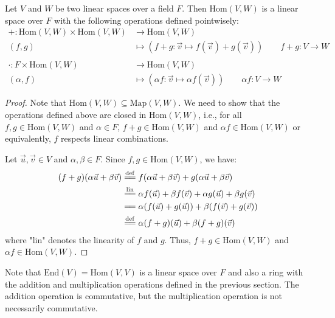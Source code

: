 \documentclass[11pt,fleqn]{book} %
\newcommand{\End}[1]{\text{End}(#1)} %
\newcommand{\Hom}[2]{\text{Hom}(#1, #2)} %
\begin{document}
\begin{proposition}
    Let $V$ and $W$ be two linear spaces over a field $F$. Then $\Hom{V}{W}$ is a linear space over $F$ with the following operations defined pointwisely:
    \[
        \begin{split}
            + : \Hom{V}{W} \times \Hom{V}{W} &\to \Hom{V}{W} \\
            (f,g) &\mapsto (f+g: \vec{v} \mapsto f(\vec{v}) + g(\vec{v})) \qquad f + g : V \to W \\ \\
            \cdot : F \times \Hom{V}{W} &\to \Hom{V}{W} \\
            (\alpha,f) &\mapsto (\alpha f: \vec{v} \mapsto \alpha f(\vec{v})) \qquad \alpha f : V \to W
        \end{split}
    \]
\end{proposition}

\begin{proof}
    Note that $\Hom{V}{W} \subseteq \text{Map}(V, W)$. We need to show that the operations defined above are closed in $\Hom{V}{W}$, i.e., for all $f, g \in \Hom{V}{W}$ and $\alpha \in F$, $f + g \in \Hom{V}{W}$ and $\alpha f \in \Hom{V}{W}$ or equivalently, $f$ respects linear combinations.

    Let $\vec{u}, \vec{v} \in V$ and $\alpha, \beta \in F$. Since $f, g \in \Hom{V}{W}$, we have:
    \[
        \begin{split}
            (f + g)(\alpha\vec{u} + \beta\vec{v}) &\overset{\mathrm{def}}{=\joinrel=} f(\alpha\vec{u} + \beta\vec{v}) + g(\alpha\vec{u} + \beta\vec{v}) \\
            &\overset{\mathrm{lin}}{=\joinrel=} \alpha f(\vec{u}) + \beta f(\vec{v}) + \alpha g(\vec{u}) + \beta g(\vec{v}) \\
            &=\joinrel= \alpha (f(\vec{u}) + g(\vec{u})) + \beta (f(\vec{v}) + g(\vec{v})) \\
            &\overset{\mathrm{def}}{=\joinrel=} \alpha (f + g)(\vec{u}) + \beta (f + g)(\vec{v})
        \end{split}
    \]
    where "lin" denotes the linearity of $f$ and $g$. Thus, $f + g \in \Hom{V}{W}$ and $\alpha f \in \Hom{V}{W}$.
\end{proof}

\begin{remark}
    Note that $\End{V} = \Hom{V}{V}$ is a linear space over $F$ and also a ring with the addition and multiplication operations defined in the previous section. The addition operation is commutative, but the multiplication operation is not necessarily commutative.
\end{remark}
\end{document}
